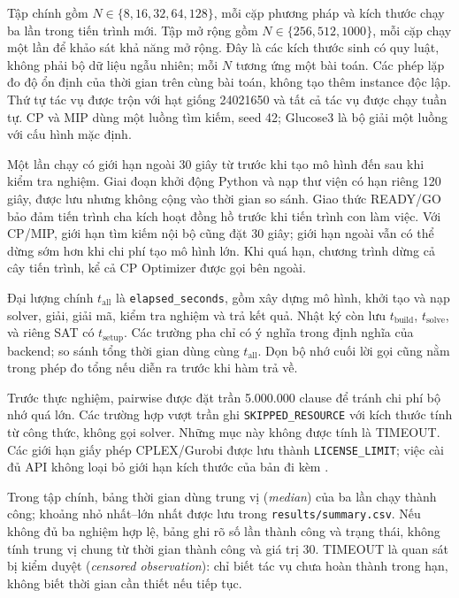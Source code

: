 \documentclass[a4paper,fleqn]{cas-sc}
\begin{document}


Tập chính gồm $N\in\{8,16,32,64,128\}$, mỗi cặp phương pháp và kích thước chạy
ba lần trong tiến trình mới. Tập mở rộng gồm $N\in\{256,512,1000\}$, mỗi cặp
chạy một lần để khảo sát khả năng mở rộng. Đây là các kích thước sinh có quy luật,
không phải bộ dữ liệu ngẫu nhiên; mỗi $N$ tương ứng một bài toán. Các phép lặp đo
độ ổn định của thời gian trên cùng bài toán, không tạo thêm instance độc lập.
Thứ tự tác vụ được trộn với hạt giống 24021650 và tất cả tác vụ được chạy tuần tự.
CP và MIP dùng một luồng tìm kiếm, seed 42; Glucose3 là bộ giải một luồng với cấu hình mặc định.

Một lần chạy có giới hạn ngoài 30 giây từ trước khi tạo mô hình đến sau khi kiểm tra
nghiệm. Giai đoạn khởi động Python và nạp thư viện có hạn riêng 120 giây,
được lưu nhưng không cộng vào thời gian so sánh. Giao thức READY/GO bảo đảm tiến trình
cha kích hoạt đồng hồ trước khi tiến trình con làm việc. Với CP/MIP, giới hạn tìm kiếm
nội bộ cũng đặt 30 giây; giới hạn ngoài vẫn có thể dừng sớm hơn khi chi phí tạo mô hình lớn.
Khi quá hạn, chương trình dừng cả cây tiến trình, kể cả CP Optimizer được gọi bên ngoài.

Đại lượng chính $t_{\mathrm{all}}$ là \texttt{elapsed\_seconds}, gồm xây dựng mô hình,
khởi tạo và nạp solver, giải, giải mã, kiểm tra nghiệm và trả kết quả.
Nhật ký còn lưu $t_{\mathrm{build}}$, $t_{\mathrm{solve}}$, và riêng SAT có
$t_{\mathrm{setup}}$. Các trường pha chỉ có ý nghĩa trong định nghĩa của backend;
so sánh tổng thời gian dùng cùng $t_{\mathrm{all}}$. Dọn bộ nhớ cuối lời gọi cũng nằm
trong phép đo tổng nếu diễn ra trước khi hàm trả về.

Trước thực nghiệm, pairwise được đặt trần 5.000.000 clause để tránh chi phí bộ nhớ
quá lớn. Các trường hợp vượt trần ghi \texttt{SKIPPED\_RESOURCE} với kích thước
tính từ công thức, không gọi solver. Những mục này không được tính là TIMEOUT.
Các giới hạn giấy phép CPLEX/Gurobi được lưu thành \texttt{LICENSE\_LIMIT};
việc cài đủ API không loại bỏ giới hạn kích thước của bản đi kèm \cite{ibmlimits,gurobilimits}.

Trong tập chính, bảng thời gian dùng trung vị (\emph{median}) của ba lần chạy thành công;
khoảng nhỏ nhất--lớn nhất được lưu trong \texttt{results/summary.csv}.
Nếu không đủ ba nghiệm hợp lệ, bảng ghi rõ số lần thành công
và trạng thái, không tính trung vị chung từ thời gian thành công và giá trị 30.
TIMEOUT là quan sát bị kiểm duyệt (\emph{censored observation}): chỉ biết tác vụ chưa
hoàn thành trong hạn, không biết thời gian cần thiết nếu tiếp tục.
\end{document}
